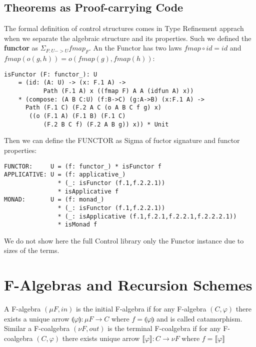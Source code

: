\documentclass{article}
\begin{document}
\subsection{Theorems as Proof-carrying Code}

The formal definition of control structures comes in Type Refinement apprach when
we separate the algebraic structure and its properties. Such we defined the {\bf functor}
as $\Sigma_{F:U->U} fmap_F$. An the Functor has two laws $fmap \circ id = id$ and
$ fmap(o(g,h)) = o(fmap(g),fmap(h))$:

\begin{lstlisting}[mathescape=true]
isFunctor (F: functor_): U
    = (id: (A: U) -> (x: F.1 A) ->
           Path (F.1 A) x ((fmap F) A A (idfun A) x))
    * (compose: (A B C:U) (f:B->C) (g:A->B) (x:F.1 A) ->
      Path (F.1 C) (F.2 A C (o A B C f g) x)
       ((o (F.1 A) (F.1 B) (F.1 C)
           (F.2 B C f) (F.2 A B g)) x)) * Unit
\end{lstlisting}

Then we can define the FUNCTOR as Sigma of fuctor signature and functor properties:

\begin{lstlisting}[mathescape=true]
FUNCTOR:     U = (f: functor_) * isFunctor f
APPLICATIVE: U = (f: applicative_)
               * (_: isFunctor (f.1,f.2.2.1))
               * isApplicative f
MONAD:       U = (f: monad_)
               * (_: isFunctor (f.1,f.2.2.1))
               * (_: isApplicative (f.1,f.2.1,f.2.2.1,f.2.2.2.1))
               * isMonad f
\end{lstlisting}

We do not show here the full Control library only the Functor instance due to sizes of the terms.

\newpage
\section{F-Algebras and Recursion Schemes}

A F-algebra $(\mu F, in)$ is the initial F-algebra if for any F-algebra $(C, \varphi)$
there exists a unique arrow $\llparenthesis \varphi \rrparenthesis : \mu F \rightarrow C$ where $f = \llparenthesis \varphi \rrparenthesis$
and is called catamorphism. Similar a F-coalgebra $(\nu F, out)$ is the terminal
F-coalgebra if for any F-coalgebra $(C, \varphi)$ there exists unique arrow
$\llbracket \varphi \rrbracket : C \rightarrow \nu F$ where $f =
\llbracket \varphi \rrbracket$
\end{document}

